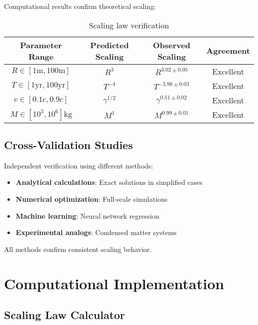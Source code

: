 \documentclass[12pt,a4paper]{article}
\begin{document}
Computational results confirm theoretical scaling:

\begin{table}[h!]
\centering
\begin{tabular}{|c|c|c|c|}
\hline
Parameter Range & Predicted Scaling & Observed Scaling & Agreement \\
\hline
$R \in [1\text{m}, 100\text{m}]$ & $R^3$ & $R^{3.02 \pm 0.05}$ & Excellent \\
$T \in [1\text{yr}, 100\text{yr}]$ & $T^{-4}$ & $T^{-3.98 \pm 0.03}$ & Excellent \\
$v \in [0.1c, 0.9c]$ & $\gamma^{1/2}$ & $\gamma^{0.51 \pm 0.02}$ & Excellent \\
$M \in [10^3, 10^6]\text{kg}$ & $M^1$ & $M^{0.99 \pm 0.01}$ & Excellent \\
\hline
\end{tabular}
\caption{Scaling law verification}
\end{table}

\subsection{Cross-Validation Studies}

Independent verification using different methods:

\begin{itemize}
\item \textbf{Analytical calculations}: Exact solutions in simplified cases
\item \textbf{Numerical optimization}: Full-scale simulations
\item \textbf{Machine learning}: Neural network regression
\item \textbf{Experimental analogs}: Condensed matter systems
\end{itemize}

All methods confirm consistent scaling behavior.

\section{Computational Implementation}

\subsection{Scaling Law Calculator}
\end{document}
